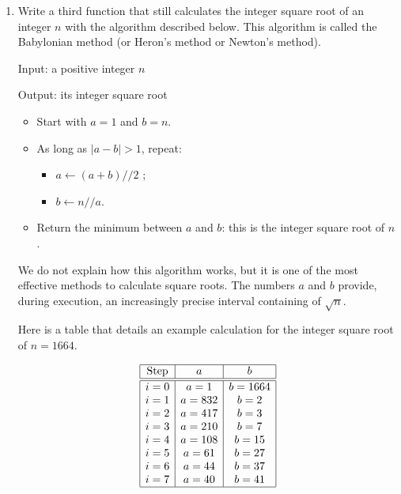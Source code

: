 \documentclass[11pt,class=report,crop=false]{standalone}
\begin{document}
\begin{activite}
\begin{enumerate}
  \item Write a third function that still calculates the integer square root of an integer $n$ with the algorithm described below. This algorithm is called the Babylonian method (or Heron's method or Newton's method).
  
    \begin{algorithme}
  Input: a positive integer $n$

  Output: its integer square root

  \begin{itemize}
    \item Start with $a=1$ and $b=n$.
    
    \item As long as $|a-b| > 1$, repeat:
    \begin{itemize} 
     \item $a \leftarrow (a+b)//2$ ;
     \item $b \leftarrow n // a$. 
    \end{itemize}          
         
    \item Return the minimum between $a$ and $b$: this is the integer square root of $n$.
  \end{itemize} 
           
 \end{algorithme}
 
 
  We do not explain how this algorithm works, but it is one of the most effective methods to calculate square roots. The numbers $a$ and $b$ provide, during execution, an increasingly precise interval containing of $\sqrt{n}$. 
  
  Here is a table that details an example calculation for the integer square root of $n=1664$.

  \medskip
  
$$\begin{array}{|c|c|c|} 
\hline
\text{Step} & a & b \\ \hline\hline
i = 0  &  a =  1    &  b =  1664 \\
i = 1  &  a =  832  &  b =  2 \\
i = 2  &  a =  417  &  b =  3 \\
i = 3  &  a =  210  &  b =  7 \\
i = 4  &  a =  108  &  b =  15 \\
i = 5  &  a =  61   &  b =  27 \\
i = 6  &  a =  44   &  b =  37 \\
i = 7  &  a =  40   &  b =  41 \\ \hline
\end{array}$$


\end{enumerate}
\end{activite}
\end{document}
